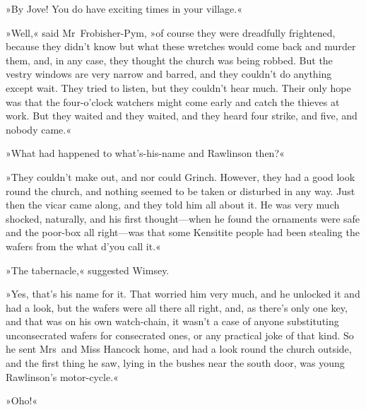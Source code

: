 »By Jove! You do have exciting times in your village.«

»Well,« said Mr~Frobisher-Pym, »of course they were dreadfully frightened, because they didn't know but what these wretches would come back and murder them, and, in any case, they thought the church was being robbed. But the vestry windows are very narrow and barred, and they couldn't do anything except wait. They tried to listen, but they couldn't hear much. Their only hope was that the four-o'clock watchers might come early and catch the thieves at work. But they waited and they waited, and they heard four strike, and five, and nobody came.«

»What had happened to what's-his-name and Rawlinson then?«

»They couldn't make out, and nor could Grinch. However, they had a good look round the church, and nothing seemed to be taken or disturbed in any way. Just then the vicar came along, and they told him all about it. He was very much shocked, naturally, and his first thought—when he found the ornaments were safe and the poor-box all right—was that some Kensitite people had been stealing the wafers from the what d'you call it.«

»The tabernacle,« suggested Wimsey.

»Yes, that's his name for it. That worried him very much, and he unlocked it and had a look, but the wafers were all there all right, and, as there's only one key, and that was on his own watch-chain, it wasn't a case of anyone substituting unconsecrated wafers for consecrated ones, or any practical joke of that kind. So he sent Mrs~and Miss Hancock home, and had a look round the church outside, and the first thing he saw, lying in the bushes near the south door, was young Rawlinson's motor-cycle.«

»Oho!«

